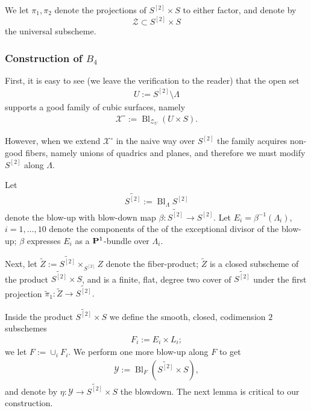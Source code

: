 \documentclass[12pt,reqno]{amsart}
\DeclareMathOperator{\Bl}{Bl}
\renewcommand{\to}{{\longrightarrow}}
\numberwithin{equation}{section}
\newcommand{\cX}{\mathcal{X}}
\begin{document}
We let $\pi_{1}, \pi_{2}$ denote the projections of $S^{[2]} \times S$
to either factor, and denote by
$$\mathcal{Z} \subset S^{[2]} \times S$$ the universal subscheme. 

\subsubsection{Construction of $B_4$}
\label{sec:construction-b_4}





First, it is easy to see (we leave the verification to the reader)
that the open set
\begin{align} 
  \label{eq:UB3}
  U := S^{[2]} \setminus \Lambda
\end{align}
supports a good family of cubic surfaces, namely
\begin{align}
  \label{eq:XUB3}
  \cX^{\circ} := \Bl_{\mathcal{Z}_{U}}(U \times S).
\end{align}


However, when we extend $\cX^{\circ}$ in the naive way over $S^{[2]}$
the family acquires non-good fibers, namely unions of quadrics and
planes, and therefore we must modify $S^{[2]}$ along $\Lambda$.

Let
\begin{align}
  \label{eq:S2tilde}
  \widetilde{S^{[2]}} := \Bl_{\Lambda}S^{[2]}
\end{align}
denote the blow-up with blow-down map
$\beta: \widetilde{S^{[2]}} \to S^{[2]}$.  Let
$E_{i} = \beta^{-1}(\Lambda_{i})$, $i=1, \dots, 10$ denote the
components of the of the exceptional divisor of the blow-up; $\beta$
expresses $E_{i}$ as a $\P^{1}$-bundle over $\Lambda_{i}$.

Next, let $\widetilde{Z} := \widetilde{S^{[2]}} \times_{S^{[2]}} Z$
denote the fiber-product; $\widetilde{Z}$ is a closed subscheme of the
product $\widetilde{S^{[2]}} \times S$, and is a finite, flat, degree
two cover of $\widetilde{S^{[2]}}$ under the first projection
$\tilde{\pi}_{1} : \widetilde{Z} \to \widetilde{S^{[2]}}.$

Inside the product $\widetilde{S^{[2]}} \times S$ we define the
smooth, closed, codimension $2$ subschemes
\begin{align}
  \label{eq:Fi}
  F_{i} := E_{i} \times L_{i};
\end{align}
we let $F := \cup_{i}F_{i}$.  We perform one more blow-up along $F$ to
get
\begin{align}
  \label{eq:Xtilde}
  \mathcal{Y} := \Bl_{F}\left( \widetilde{S^{[2]}} \times S \right),
\end{align}
and denote by $\eta: \mathcal{Y} \to \widetilde{S^{[2]}} \times S $
the blowdown.  The next lemma is critical to our construction.
\end{document}
